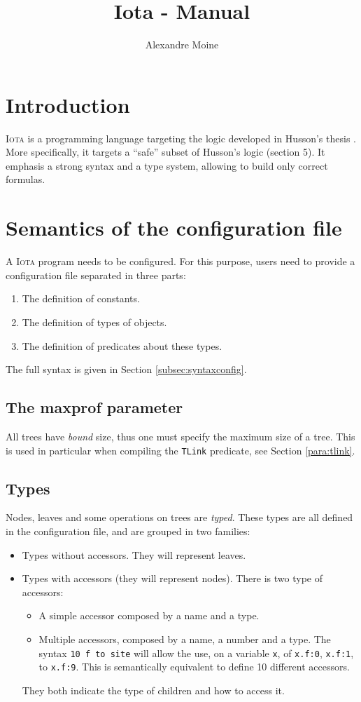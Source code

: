 \documentclass[10pt,a4paper]{article}
\author{Alexandre Moine}
\title{Iota - Manual}
\newcommand\Iota{\textsc{Iota}}
\newcommand{\ocaml}{\texttt}
\begin{document}
\maketitle
\tableofcontents

\section{Introduction}
\Iota{} is a programming language targeting the logic developed in Husson's thesis \cite{husson}. More specifically, it targets a ``safe'' subset of Husson's logic (section 5). It emphasis a strong syntax and a type system, allowing to build only correct formulas.

\section{Semantics of the configuration file}
A \Iota{} program needs to be configured. For this purpose, users need to provide a configuration file separated in three parts:
\begin{enumerate}
\item The definition of constants.
\item The definition of types of objects.
\item The definition of predicates about these types.
\end{enumerate}

The full syntax is given in Section \ref{subsec:syntaxconfig}.
\subsection{The maxprof parameter}
All trees have \emph{bound} size, thus one must specify the maximum size of a tree. This is used in particular when compiling the \ocaml{TLink} predicate, see Section \ref{para:tlink}.

\subsection{Types}
Nodes, leaves and some operations on trees are \emph{typed}. These types are all defined in the configuration file, and are grouped in two families:
\begin{itemize}
\item Types without accessors. They will represent leaves.
\item Types with accessors (they will represent nodes). There is two type of accessors:
  \begin{itemize}
  \item A simple accessor composed by a name and a type.
  \item Multiple accessors, composed by a name, a number and a type. The syntax \ocaml{10 f to site} will allow the use, on a variable \ocaml{x}, of \ocaml{x.f:0}, \ocaml{x.f:1}, to \ocaml{x.f:9}. This is semantically equivalent to define 10 different accessors.
  \end{itemize}
  They both indicate the type of children and how to access it.
\end{itemize}
\end{document}

